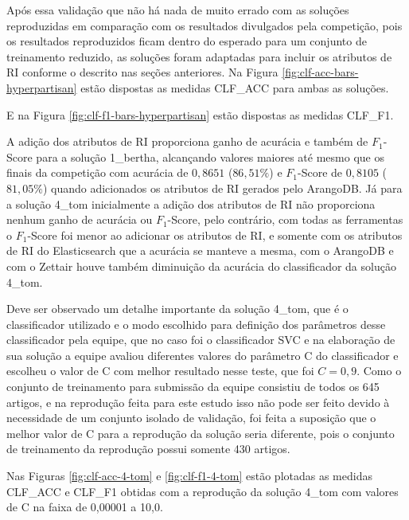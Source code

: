 			Após essa validação que não há nada de muito errado com as soluções reproduzidas em comparação com os resultados divulgados pela competição, pois os resultados reproduzidos ficam dentro do esperado para um conjunto de treinamento reduzido, as soluções foram adaptadas para incluir os atributos de RI conforme o descrito nas seções anteriores.
			Na Figura \ref{fig:clf-acc-bars-hyperpartisan} estão dispostas as medidas CLF\_ACC para ambas as soluções.
			
			

			E na Figura \ref{fig:clf-f1-bars-hyperpartisan} estão dispostas as medidas CLF\_F1.
			
			

			A adição dos atributos de RI proporciona ganho de acurácia e também de $F_1$-Score para a solução 1\_bertha, alcançando valores maiores até mesmo que os finais da competição com acurácia de $0,8651$ ($86,51\%$) e $F_1$-Score de $0,8105$ ($81,05\%$) quando adicionados os atributos de RI gerados pelo ArangoDB.
			Já para a solução 4\_tom inicialmente a adição dos atributos de RI não proporciona nenhum ganho de acurácia ou $F_1$-Score, pelo contrário, com todas as ferramentas o $F_1$-Score foi menor ao adicionar os atributos de RI, e somente com os atributos de RI do Elasticsearch que a acurácia se manteve a mesma, com o ArangoDB e com o Zettair houve também diminuição da acurácia do classificador da solução 4\_tom.

			Deve ser observado um detalhe importante da solução 4\_tom, que é o classificador utilizado e o modo escolhido para definição dos parâmetros desse classificador pela equipe, que no caso foi o classificador SVC e na elaboração de sua solução a equipe avaliou diferentes valores do parâmetro C do classificador e escolheu o valor de C com melhor resultado nesse teste, que foi $C = 0,9$.
			Como o conjunto de treinamento para submissão da equipe consistiu de todos os 645 artigos, e na reprodução feita para este estudo isso não pode ser feito devido à necessidade de um conjunto isolado de validação, foi feita a suposição que o melhor valor de C para a reprodução da solução seria diferente, pois o conjunto de treinamento da reprodução possui somente 430 artigos.
			
			Nas Figuras \ref{fig:clf-acc-4-tom} e \ref{fig:clf-f1-4-tom} estão plotadas as medidas CLF\_ACC e CLF\_F1 obtidas com a reprodução da solução 4\_tom com valores de C na faixa de 0,00001 a 10,0.
			
